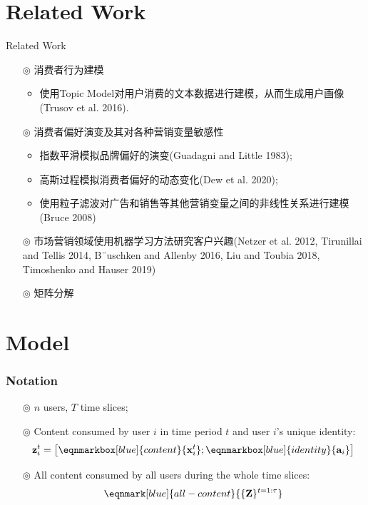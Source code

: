 \documentclass{beamer}
\begin{document}
\section{Related Work}

\begin{frame}{Related Work}
	\begin{itemize}
		\item[$\circledcirc$] 消费者行为建模
		      \begin{itemize}
			      \item 使用Topic Model对用户消费的文本数据进行建模，从而生成用户画像(Trusov et al. 2016).
		      \end{itemize}
		\item[$\circledcirc$] 消费者偏好演变及其对各种营销变量敏感性
		      \begin{itemize}
			      \item 指数平滑模拟品牌偏好的演变(Guadagni and Little 1983);
			      \item 高斯过程模拟消费者偏好的动态变化(Dew et al. 2020);
			      \item 使用粒子滤波对广告和销售等其他营销变量之间的非线性关系进行建模(Bruce 2008)
		      \end{itemize}
		\item[$\circledcirc$] 市场营销领域使用机器学习方法研究客户兴趣(Netzer et al. 2012, Tirunillai and Tellis 2014, B¨uschken and Allenby 2016, Liu and Toubia 2018, Timoshenko and Hauser 2019)
		\item[$\circledcirc$] 矩阵分解
	\end{itemize}
\end{frame}

\section{Model}

\begin{frame}
	\frametitle{Notation}
	\begin{itemize}
		\item[$\circledcirc$] $n$ users, $T$ time slices;
		\item[$\circledcirc$] Content consumed by user $i$ in time period $t$ and user $i$'s unique identity:
		      \begin{equation*}
			      \mathbf{z}_{i}^{t} = \left[\eqnmarkbox[blue]{content}{\mathbf{x}_{i}^{t}} ;\eqnmarkbox[blue]{identity}{\mathbf{a}_{i}}\right]
		      \end{equation*}
		\item[$\circledcirc$]  All content consumed by all users during the whole time slices:
		      \begin{equation*}
			      \eqnmark[blue]{all-content}{\{\mathbf{Z}\}^{t=1: \tau}}
		      \end{equation*}
	\end{itemize}
\end{frame}
\end{document}
